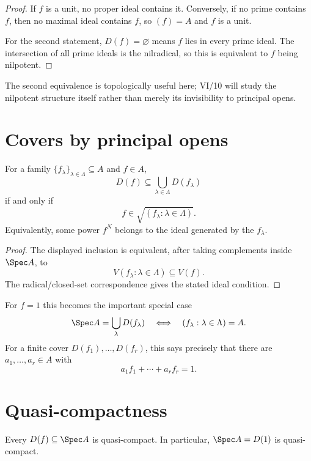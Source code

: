 \begin{proof}
If $f$ is a unit, no proper ideal contains it.  Conversely, if no prime contains $f$, then
no maximal ideal contains $f$, so $(f)=A$ and $f$ is a unit.

For the second statement, $D(f)=\varnothing$ means $f$ lies in every prime ideal.  The
intersection of all prime ideals is the nilradical, so this is equivalent to $f$ being
nilpotent.
\end{proof}

The second equivalence is topologically useful here; VI/10 will study the nilpotent
structure itself rather than merely its invisibility to principal opens.

\section{Covers by principal opens}

\begin{theorem}
For a family $\{f_\lambda\}_{\lambda\in\Lambda}\subseteq A$ and $f\in A$,
\[
D(f)\subseteq\bigcup_{\lambda\in\Lambda}D(f_\lambda)
\]
if and only if
\[
f\in\sqrt{(f_\lambda:\lambda\in\Lambda)}.
\]
Equivalently, some power $f^N$ belongs to the ideal generated by the $f_\lambda$.
\end{theorem}

\begin{proof}
The displayed inclusion is equivalent, after taking complements inside $\Spec A$, to
\[
V(f_\lambda:\lambda\in\Lambda)\subseteq V(f).
\]
The radical/closed-set correspondence gives the stated ideal condition.
\end{proof}

For $f=1$ this becomes the important special case
\[
\Spec A=\bigcup_\lambda D(f_\lambda)
\quad\Longleftrightarrow\quad
(f_\lambda:\lambda\in\Lambda)=A.
\]
For a finite cover $D(f_1),\dots,D(f_r)$, this says precisely that there are
$a_1,\dots,a_r\in A$ with
\[
a_1f_1+\cdots+a_rf_r=1.
\]



\section{Quasi-compactness}

\begin{theorem}
Every $D(f)\subseteq\Spec A$ is quasi-compact.  In particular, $\Spec A=D(1)$ is
quasi-compact.
\end{theorem}

